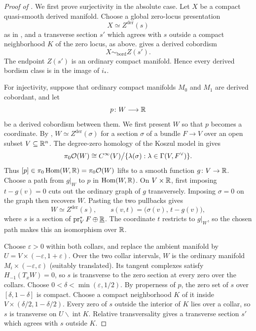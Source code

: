 \begin{proof}[Proof of ]
  We first prove surjectivity in the absolute case. Let $X$ be a compact
  quasi-smooth derived manifold. Choose a global zero-locus presentation
  \[
    X\simeq Z^{\mathrm{der}}(s)
  \]
  as in , and a
  transverse section $s'$ which agrees with $s$ outside a compact
  neighborhood $K$ of the zero locus, as above.
   gives a derived
  cobordism
  \[
    X\sim_{\mathrm{bord}}Z(s').
  \]
  The endpoint $Z(s')$ is an ordinary compact manifold. Hence every derived
  bordism class is in the image of $i_*$.

  For injectivity, suppose that ordinary compact manifolds $M_0$ and $M_1$
  are derived cobordant, and let
  \[
    p\colon W\longrightarrow\mathbb{R}
  \]
  be a derived cobordism between them. We first present $W$ so that $p$
  becomes a coordinate. By ,
  $W\simeq Z^{\mathrm{der}}(\sigma)$ for a section $\sigma$ of a bundle
  $F\to V$ over an open subset $V\subseteq\mathbb{R}^n$. The degree-zero homology
  of the Koszul model in  gives
  \[
    \pi_0\mathcal O(W)\cong
    C^\infty(V)\big/\{\lambda(\sigma):\lambda\in\Gamma(V,F^\vee)\}.
  \]
  Thus $[p]\in\pi_0\operatorname{Hom}(W,\mathbb{R})=\pi_0\mathcal O(W)$ lifts to a smooth function
  $g\colon V\to\mathbb{R}$. Choose a path from $g|_W$ to $p$ in $\operatorname{Hom}(W,\mathbb{R})$.
  On $V\times\mathbb{R}$, first imposing $t-g(v)=0$ cuts out the ordinary graph
  of $g$ transversely. Imposing $\sigma=0$ on the graph then recovers $W$.
  Pasting the two pullbacks gives
  \[
    W\simeq Z^{\mathrm{der}}(s),
    \qquad
    s(v,t)=\bigl(\sigma(v),\,t-g(v)\bigr),
  \]
  where $s$ is a section of $\operatorname{pr}_V^*F\oplus\underline{\mathbb{R}}$.
  The coordinate $t$ restricts to $g|_W$, so the chosen path makes this
  an isomorphism over $\mathbb{R}$.

  Choose $\varepsilon>0$ within both collars, and replace the ambient
  manifold by $U=V\times(-\varepsilon,1+\varepsilon)$. Over the two collar
  intervals, $W$ is the ordinary manifold $M_i\times(-\varepsilon,\varepsilon)$
  (suitably translated). Its tangent complexes satisfy
  $H_{-1}(T_xW)=0$, so $s$ is transverse to the zero section at every zero
  over the collars. Choose $0<\delta<\min(\varepsilon,1/2)$. By properness of $p$, the
  zero set of $s$ over $[\delta,1-\delta]$ is compact. Choose a compact
  neighborhood $K$ of it inside $V\times(\delta/2,1-\delta/2)$. Every zero
  of $s$ outside the interior of $K$ lies over a collar, so $s$ is
  transverse on $U\smallsetminus\operatorname{int}K$. Relative transversality
  gives a transverse section $s'$ which agrees with $s$ outside $K$.


\end{proof}
